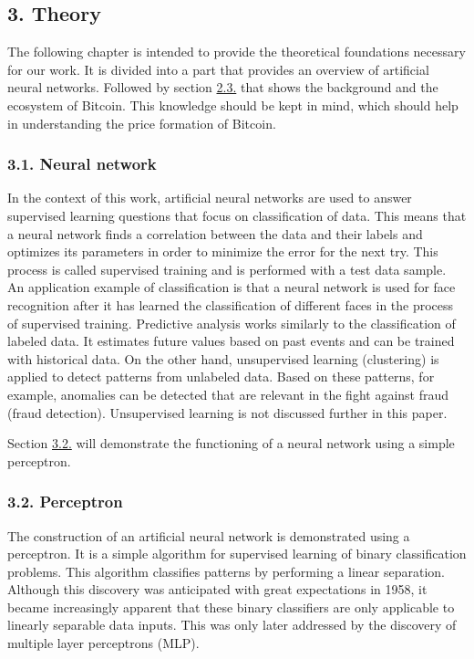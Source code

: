 \documentclass[
]{article}
\begin{document}
\newpage

\hypertarget{theory}{%
\subsection{3. Theory}\label{theory}}

The following chapter is intended to provide the theoretical foundations
necessary for our work. It is divided into a part that provides an
overview of artificial neural networks. Followed by section
\protect\hyperlink{bitcoin}{2.3.} that shows the background and the
ecosystem of Bitcoin. This knowledge should be kept in mind, which
should help in understanding the price formation of Bitcoin.

\hypertarget{neural-network}{%
\subsubsection{3.1. Neural network}\label{neural-network}}

In the context of this work, artificial neural networks are used to
answer supervised learning questions that focus on classification of
data. This means that a neural network finds a correlation between the
data and their labels and optimizes its parameters in order to minimize
the error for the next try. This process is called supervised training
and is performed with a test data sample. An application example of
classification is that a neural network is used for face recognition
after it has learned the classification of different faces in the
process of supervised training. Predictive analysis works similarly to
the classification of labeled data. It estimates future values based on
past events and can be trained with historical data. On the other hand,
unsupervised learning (clustering) is applied to detect patterns from
unlabeled data. Based on these patterns, for example, anomalies can be
detected that are relevant in the fight against fraud (fraud detection).
Unsupervised learning is not discussed further in this paper.

Section \protect\hyperlink{Perceptron}{3.2.} will demonstrate the
functioning of a neural network using a simple perceptron.

\hypertarget{perceptron}{%
\subsubsection{3.2. Perceptron}\label{perceptron}}

The construction of an artificial neural network is demonstrated using a
perceptron. It is a simple algorithm for supervised learning of binary
classification problems. This algorithm classifies patterns by
performing a linear separation. Although this discovery was anticipated
with great expectations in 1958, it became increasingly apparent that
these binary classifiers are only applicable to linearly separable data
inputs. This was only later addressed by the discovery of multiple layer
perceptrons (MLP).
\end{document}
